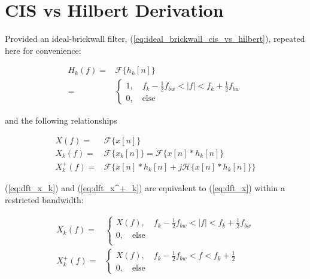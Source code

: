\documentclass [11pt, proquest,oneside] {ganter_thesis}[2015/03/03]
\begin{document}
\section{CIS vs Hilbert Derivation}\label{section:cis_vs_hilbert_derivation}

Provided an ideal-brickwall filter, (\ref{eq:ideal_brickwall_cis_vs_hilbert}), repeated here for convenience:

\begin{align}
H_k(f) =& \mathcal{F}\Big\{ h_k[n]  \Big\} \nonumber \\
=& \left\{
                \begin{array}{ll}
                1, \quad f_k - \frac{1}{2} f_{bw} < |f| < f_k + \frac{1}{2} f_{bw} \\
                0, \quad \mathrm{else}
                \end{array}
              \right. 
              \nonumber
\end{align}

and the following relationships

\begin{align}
\label{eq:dft_x}
X(f) =& \mathcal{F}\Big\{ x[n] \Big\} \\
%
\label{eq:dft_x_k}
X_{k}(f) =& \mathcal{F}\Big\{ x_k[n] \Big\} = \mathcal{F}\Big\{ x[n] * h_k[n] \Big\} \\
%
\label{eq:dft_x^+_k}
X^+_{k}(f) =& \mathcal{F}\Big\{ x[n] * h_k[n] + j\mathcal{H} \big\{ x[n] * h_k[n] \big\} \Big\}
\end{align}

(\ref{eq:dft_x_k}) and (\ref{eq:dft_x^+_k}) are equivalent to (\ref{eq:dft_x}) within a restricted bandwidth:

\begin{align}
\label{eq:X_k_bounds}
X_{k}(f) =& \left\{
                \begin{array}{ll}
X(f), \quad f_k - \frac{1}{2} f_{bw} < |f| < f_k + \frac{1}{2} f_{bw} \\
0, \quad \mathrm{else} \\
                \end{array}
              \right. \\
\label{eq:X^+_k_bounds}
X^+_{k}(f) =& \left\{
                \begin{array}{ll}
X(f), \quad f_k - \frac{1}{2} f_{bw} < f < f_k + \frac{1}{2} \\
0, \quad \mathrm{else}
                \end{array}
              \right.
\end{align}
\end{document}
